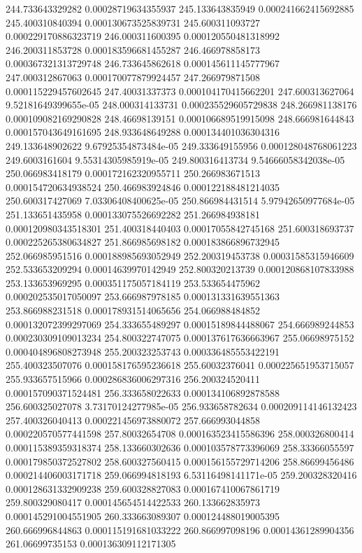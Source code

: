 {244.733643329282 0.00028719634355937
245.133643835949 0.000241662415692885
245.400310840394 0.000130673525839731
245.600311093727 0.000229170886323719
246.000311600395 0.000120550481318992
246.200311853728 0.000183596681455287
246.466978858173 0.000367321313729748
246.733645862618 0.000145611145777967
247.000312867063 0.000170077879924457
247.266979871508 0.000115229457602645
247.40031337373 0.000104170415662201
247.600313627064 9.52181649399655e-05
248.000314133731 0.000235529605729838
248.266981138176 0.000109082169290828
248.46698139151 0.000106689519915098
248.666981644843 0.000157043649161695
248.933648649288 0.000134401036304316
249.133648902622 9.67925354873484e-05
249.333649155956 0.000128048768061223
249.6003161604 9.55314305985919e-05
249.800316413734 9.54666058342038e-05
250.066983418179 0.000172162320955711
250.266983671513 0.000154720634938524
250.466983924846 0.000122188481214035
250.600317427069 7.03306408400625e-05
250.866984431514 5.97942650977684e-05
251.133651435958 0.000133075526692282
251.266984938181 0.000120980343518301
251.400318440403 0.00017055842745168
251.600318693737 0.000225265380634827
251.866985698182 0.000183866896732945
252.066985951516 0.000188985693052949
252.200319453738 0.00031585315946609
252.533653209294 0.00014639970142949
252.800320213739 0.000120868107833988
253.133653969295 0.000351175057184119
253.533654475962 0.000202535017050097
253.666987978185 0.000131331639551363
253.866988231518 0.000178931514065656
254.066988484852 0.000132072399297069
254.333655489297 0.00015189844488067
254.666989244853 0.000230309109013234
254.800322747075 0.000137617636663967
255.06698975152 0.000404896808273948
255.200323253743 0.000336485553422191
255.400323507076 0.000158176595236618
255.60032376041 0.000225651953715057
255.933657515966 0.000286836006297316
256.200324520411 0.000157090371524481
256.333658022633 0.000134106892878588
256.600325027078 3.73170124277985e-05
256.933658782634 0.000209114146132423
257.400326040413 0.000221456973880072
257.666993044858 0.000220570577441598
257.80032654708 0.000163523415586396
258.000326800414 0.000115389359318374
258.133660302636 0.000103578773396069
258.33366055597 0.000179850372527802
258.600327560415 0.000156155729714206
258.86699456486 0.000214406003171718
259.066994818193 6.53116498141171e-05
259.200328320416 0.000128631332909238
259.600328827083 0.000167410067861719
259.800329080417 0.000145654514422533
260.133662835973 0.000145291004551905
260.333663089307 0.000124488019005395
260.666996844863 0.000115191681033222
260.866997098196 0.00014361289904356
261.06699735153 0.000136309112171305
}
